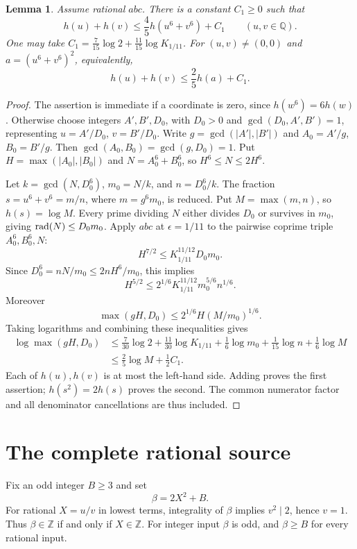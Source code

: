 \documentclass[11pt,a4paper]{article}
\newtheorem{lemma}[theorem]{Lemma}
\newcommand{\Q}{\mathbb Q}\newcommand{\Z}{\mathbb Z}
\begin{document}
\begin{lemma}\label{lem:sixth}
Assume rational $abc$. There is a constant $C_1\ge0$ such that
\[
 h(u)+h(v)\le\frac45 h(u^6+v^6)+C_1\qquad(u,v\in\Q).
\]
One may take
$C_1=\frac7{15}\log2+\frac{11}{15}\log K_{1/11}$.
For $(u,v)\ne(0,0)$ and $a=(u^6+v^6)^2$, equivalently,
\[
                       h(u)+h(v)\le\frac25h(a)+C_1.
\]
\end{lemma}
\begin{proof}
The assertion is immediate if a coordinate is zero, since
$h(w^6)=6h(w)$. Otherwise choose integers $A',B',D_0$, with
$D_0>0$ and $\gcd(D_0,A',B')=1$, representing
$u=A'/D_0$, $v=B'/D_0$. Write $g=\gcd(|A'|,|B'|)$ and
$A_0=A'/g$, $B_0=B'/g$. Then $\gcd(A_0,B_0)=\gcd(g,D_0)=1$.
Put $H=\max(|A_0|,|B_0|)$ and $N=A_0^6+B_0^6$, so
$H^6\le N\le2H^6$.

Let $k=\gcd(N,D_0^6)$, $m_0=N/k$, and $n=D_0^6/k$.
The fraction $s=u^6+v^6=m/n$, where $m=g^6m_0$, is reduced.
Put $M=\max(m,n)$, so $h(s)=\log M$. Every prime dividing
$N$ either divides $D_0$ or survives in $m_0$, giving
$\operatorname{rad}(N)\le D_0m_0$. Apply $abc$ at $\epsilon=1/11$ to the
pairwise coprime triple $A_0^6,B_0^6,N$:
\[
 H^{7/2}\le K_{1/11}^{11/12}D_0m_0.
\]
Since $D_0^6=nN/m_0\le2nH^6/m_0$, this implies
\[
 H^{5/2}\le2^{1/6}K_{1/11}^{11/12}m_0^{5/6}n^{1/6}.
\]
Moreover
\[
 \max(gH,D_0)\le2^{1/6}H(M/m_0)^{1/6}.
\]
Taking logarithms and combining these inequalities gives
\begin{align*}
 \log\max(gH,D_0)
 &\le\frac7{30}\log2+\frac{11}{30}\log K_{1/11}
       +\frac16\log m_0+\frac1{15}\log n+\frac16\log M\\
 &\le\frac25\log M+\frac12 C_1.
\end{align*}
Each of $h(u),h(v)$ is at most the left-hand side. Adding proves
the first assertion; $h(s^2)=2h(s)$ proves the second.
The common numerator factor and all denominator cancellations
are thus included.
\end{proof}

\section{The complete rational source}

Fix an odd integer $B\ge3$ and set
\begin{equation}\label{eq:input}
                            \beta=2X^2+B.
\end{equation}
For rational $X=u/v$ in lowest terms, integrality of $\beta$
implies $v^2\mid2$, hence $v=1$. Thus $\beta\in\Z$ if and
only if $X\in\Z$. For integer input $\beta$ is odd, and
$\beta\ge B$ for every rational input.
\end{document}
